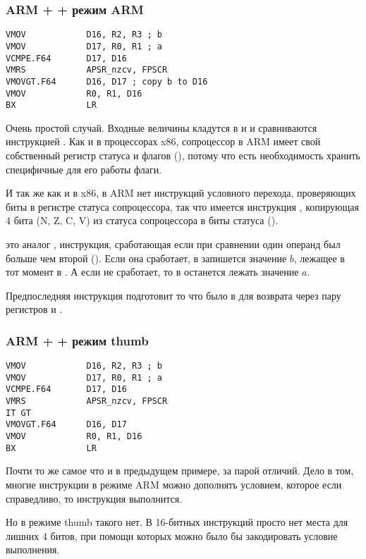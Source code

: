 ﻿\subsubsection{ARM + \OptimizingXcode + режим ARM}

\begin{lstlisting}
VMOV            D16, R2, R3 ; b
VMOV            D17, R0, R1 ; a
VCMPE.F64       D17, D16
VMRS            APSR_nzcv, FPSCR
VMOVGT.F64      D16, D17 ; copy b to D16
VMOV            R0, R1, D16
BX              LR
\end{lstlisting}

Очень простой случай. Входные величины кладутся в  и  и сравниваются инструкцией 
.
Как и в процессорах x86, сопроцессор в ARM имеет свой собственный регистр статуса и флагов (),
потому что есть необходимость хранить специфичные для его работы флаги.

И так же как и в x86, в ARM нет инструкций условного перехода, 
проверяющих биты в регистре статуса сопроцессора, так что имеется инструкция , копирующая 4 бита
(N, Z, C, V) из статуса сопроцессора в биты  статуса ().

 это аналог , инструкция, сработающая если при сравнении один операнд 
был больше чем второй
(). Если она сработает, в  запишется значение $b$, лежащее в тот момент 
в .
А если не сработает, то в  останется лежать значение $a$.

Предпоследняя инструкция подготовит то что было в  для возврата через пару регистров  
и .

\subsubsection{ARM + \OptimizingXcode + режим thumb}

\begin{lstlisting}
VMOV            D16, R2, R3 ; b
VMOV            D17, R0, R1 ; a
VCMPE.F64       D17, D16
VMRS            APSR_nzcv, FPSCR
IT GT 
VMOVGT.F64      D16, D17
VMOV            R0, R1, D16
BX              LR
\end{lstlisting}

Почти то же самое что и в предыдущем примере, за парой отличий. Дело в том, многие инструкции в режиме ARM
можно дополнять условием, которое если справедливо, то инструкция выполнится.

Но в режиме thumb такого нет. В 16-битных инструкций просто нет места для лишних 4 битов, при помощи
которых можно было бы закодировать условие выполнения.

